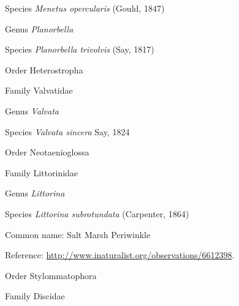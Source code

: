 \documentclass[9pt, article]{memoir}
\begin{document}
\begin{multicols}{2}
\vspace{6pt}\noindent\hspace{36pt}Species \textit{Menetus opercularis} (Gould, 1847)


\vspace{6pt}\noindent\hspace{30pt}Genus \textit{Planorbella}


\vspace{6pt}\noindent\hspace{36pt}Species \textit{Planorbella trivolvis} (Say, 1817)


\vspace{6pt}\noindent\hspace{18pt}Order Heterostropha


\vspace{6pt}\noindent\hspace{24pt}Family Valvatidae


\vspace{6pt}\noindent\hspace{30pt}Genus \textit{Valvata}


\vspace{6pt}\noindent\hspace{36pt}Species \textit{Valvata sincera} Say, 1824


\vspace{6pt}\noindent\hspace{18pt}Order Neotaenioglossa


\vspace{6pt}\noindent\hspace{24pt}Family Littorinidae


\vspace{6pt}\noindent\hspace{30pt}Genus \textit{Littorina}


\vspace{6pt}\noindent\hspace{36pt}Species \textit{Littorina subrotundata} (Carpenter, 1864)


Common name: Salt Marsh Periwinkle

Reference: 
\url{http://www.inaturalist.org/observations/6612398}.

\vspace{6pt}\noindent\hspace{18pt}Order Stylommatophora


\vspace{6pt}\noindent\hspace{24pt}Family Discidae



\end{multicols}
\end{document}
